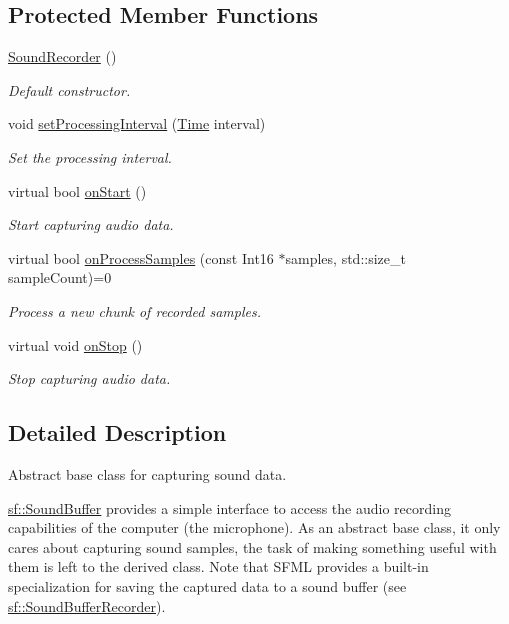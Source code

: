 \subsection*{Protected Member Functions}
\begin{DoxyCompactItemize}
\item 
\hyperlink{classsf_1_1_sound_recorder_a50ebad413c4f157408a0fa49f23212a9}{Sound\+Recorder} ()
\begin{DoxyCompactList}\small\item\em Default constructor. \end{DoxyCompactList}\item 
void \hyperlink{classsf_1_1_sound_recorder_a85b7fb8a86c08b5084f8f142767bccf6}{set\+Processing\+Interval} (\hyperlink{classsf_1_1_time}{Time} interval)
\begin{DoxyCompactList}\small\item\em Set the processing interval. \end{DoxyCompactList}\item 
virtual bool \hyperlink{classsf_1_1_sound_recorder_a7af418fb036201d3f85745bef78ce77f}{on\+Start} ()
\begin{DoxyCompactList}\small\item\em Start capturing audio data. \end{DoxyCompactList}\item 
virtual bool \hyperlink{classsf_1_1_sound_recorder_a2670124cbe7a87c7e46b4840807f4fd7}{on\+Process\+Samples} (const Int16 $\ast$samples, std\+::size\+\_\+t sample\+Count)=0
\begin{DoxyCompactList}\small\item\em Process a new chunk of recorded samples. \end{DoxyCompactList}\item 
virtual void \hyperlink{classsf_1_1_sound_recorder_aefc36138ca1e96c658301280e4a31b64}{on\+Stop} ()
\begin{DoxyCompactList}\small\item\em Stop capturing audio data. \end{DoxyCompactList}\end{DoxyCompactItemize}


\subsection{Detailed Description}
Abstract base class for capturing sound data. 

\hyperlink{classsf_1_1_sound_buffer}{sf\+::\+Sound\+Buffer} provides a simple interface to access the audio recording capabilities of the computer (the microphone). As an abstract base class, it only cares about capturing sound samples, the task of making something useful with them is left to the derived class. Note that S\+F\+ML provides a built-\/in specialization for saving the captured data to a sound buffer (see \hyperlink{classsf_1_1_sound_buffer_recorder}{sf\+::\+Sound\+Buffer\+Recorder}).

